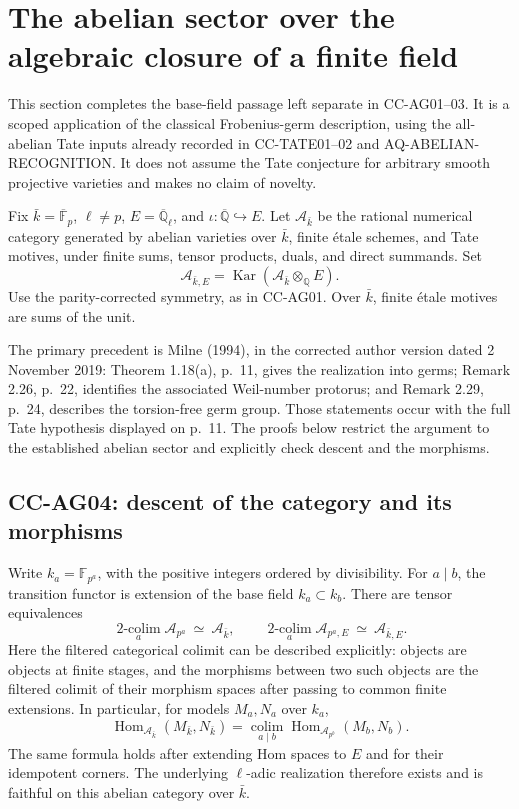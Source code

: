 \documentclass[11pt,a4paper]{article}
\theoremstyle{definition}\newtheorem{definition}[theorem]{Definition}
\theoremstyle{remark}\newtheorem{remark}[theorem]{Remark}
\begin{document}

\section{The abelian sector over the algebraic closure of a finite field}

This section completes the base-field passage left separate in
CC-AG01--03. It is a scoped application of the classical Frobenius-germ
description, using the all-abelian Tate inputs already recorded in
CC-TATE01--02 and AQ-ABELIAN-RECOGNITION. It does not assume the Tate
conjecture for arbitrary smooth projective varieties and makes no
claim of novelty.

Fix \(\bar k=\overline{\mathbb F}_p\), \(\ell\ne p\),
\(E=\overline{\mathbb Q}_\ell\), and
\(\iota:\overline{\mathbb Q}\hookrightarrow E\). Let
\(\mathcal A_{\bar k}\) be the rational numerical category generated by
abelian varieties over \(\bar k\), finite \'etale schemes, and Tate
motives, under finite sums, tensor products, duals, and direct summands.
Set
\[
 \mathcal A_{\bar k,E}
 =\operatorname{Kar}(\mathcal A_{\bar k}\otimes_{\mathbb Q}E).
\]
Use the parity-corrected symmetry, as in CC-AG01. Over \(\bar k\),
finite \'etale motives are sums of the unit.

The primary precedent is Milne (1994), in the corrected author version
dated 2 November 2019: Theorem 1.18(a), p.~11, gives the realization
into germs; Remark 2.26, p.~22, identifies the associated Weil-number
protorus; and Remark 2.29, p.~24, describes the torsion-free germ group.
Those statements occur with the full Tate hypothesis displayed on
p.~11. The proofs below restrict the argument to the established
abelian sector and explicitly check descent and the morphisms.

\subsection{CC-AG04: descent of the category and its morphisms}

Write \(k_a=\mathbb F_{p^a}\), with the positive integers ordered by
divisibility. For \(a\mid b\), the transition functor is extension of
the base field \(k_a\subset k_b\). There are tensor equivalences
\[
 \underset{a}{\operatorname{2-colim}}\mathcal A_{p^a}
 \ \simeq\ \mathcal A_{\bar k},
 \qquad
 \underset{a}{\operatorname{2-colim}}\mathcal A_{p^a,E}
 \ \simeq\ \mathcal A_{\bar k,E}.                 \tag{CC-AG.5}
\]
Here the filtered categorical colimit can be described explicitly:
objects are objects at finite stages, and the morphisms between two
such objects are the filtered colimit of their morphism spaces after
passing to common finite extensions. In particular, for models
\(M_a,N_a\) over \(k_a\),
\[
 \operatorname{Hom}_{\mathcal A_{\bar k}}(M_{\bar k},N_{\bar k})
 =
 \underset{a\mid b}{\operatorname{colim}}
 \operatorname{Hom}_{\mathcal A_{p^b}}(M_b,N_b).   \tag{CC-AG.6}
\]
The same formula holds after extending Hom spaces to \(E\) and for
their idempotent corners. The underlying \(\ell\)-adic realization
therefore exists and is faithful on this abelian category over
\(\bar k\).
\end{document}
